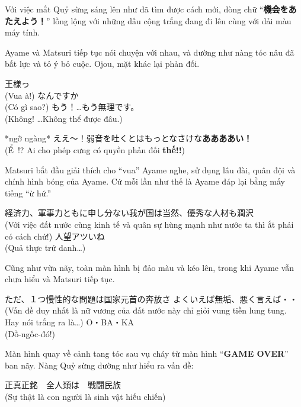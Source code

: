 \documentclass[../main.tex]{subfiles}
\begin{document}
Với việc mắt Quỷ sừng sáng lên như đã tìm được cách mới, dòng chữ ``\textbf{機会をあたえよう！}'' lồng lộng với những dấu cộng trắng đang đi lên cùng với dải màu máy tính.

Ayame và Matsuri tiếp tục nói chuyện với nhau, và dường như nàng tóc nâu đã bất lực và tỏ ý bỏ cuộc. Ojou, mặt khác lại phản đối.
\begin{dialogue}
   王様っ \\ (Vua à!)
   なんですか \\ (Có gì sao?)
   もう！…もう無理です。 \\ (Không! \dots Không thể được đâu.)
\end{dialogue}


\begin{dialogue}
   *ngỡ ngàng* ええ～！弱音を吐くとはもっとなさけな\textbf{ああああい！} \\ (Ể~!? Ai cho phép cưng có quyền phản đối \textbf{thế!!})
\end{dialogue}

Matsuri bắt đầu giải thích cho ``vua'' Ayame nghe, sử dụng lâu đài, quân đội và chính hình bóng của Ayame. Cứ mỗi lần như thế là Ayame đáp lại bằng mấy tiếng ``ừ hứ.''
\begin{dialogue}
   経済力、軍事力ともに申し分ない我が国は当然、優秀な人材も潤沢 \\ (Với việc đất nước cùng kinh tế và quân sự hùng mạnh như nước ta thì ắt phải có cách chứ!)
   人望アツいね \\ (Quả thực trứ danh\dots )
\end{dialogue}

Cũng như vừa nãy, toàn màn hình bị đảo màu và kéo lên, trong khi Ayame vẫn chưa hiểu và Matsuri tiếp tục.
\begin{dialogue}
   ただ、１つ慢性的な問題は国家元首の奔放さ  よくいえば無垢、悪く言えば・・ \\ (Vấn đề duy nhất là nữ vương của đất nước này chỉ giỏi vung tiền lung tung. Hay nói trắng ra là\dots )
   O・BA・KA \\ (Đồ-ngốc-đó!)
\end{dialogue}

Màn hình quay về cảnh tang tóc sau vụ cháy từ màn hình ``\textbf{GAME OVER}'' ban nãy. Nàng Quỷ sừng dường như hiểu ra vấn đề:
\begin{center}
  正真正銘　全人類は　戦闘民族 \\ (Sự thật là con người là sinh vật hiếu chiến)
\end{center}
\end{document}
